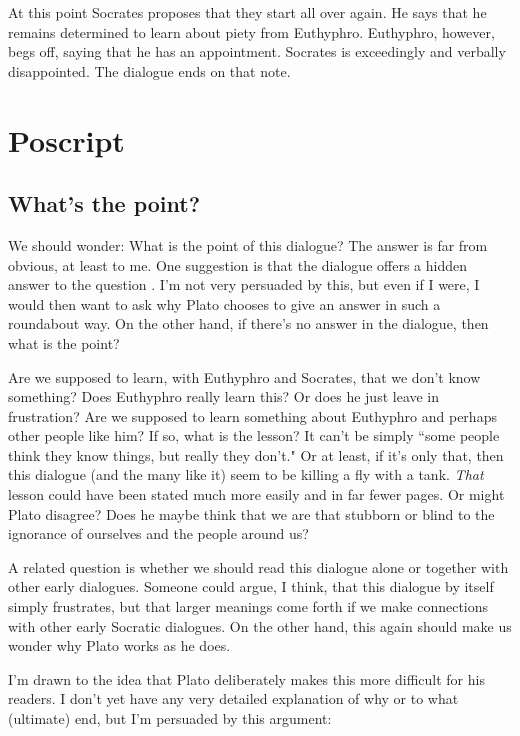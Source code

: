\documentclass[11pt]{article}
\begin{document}
At this point Socrates proposes that they start all over again.  He says that he remains determined to learn about piety from Euthyphro.  Euthyphro, however, begs off, saying that he has an appointment.  Socrates is exceedingly and verbally disappointed. The dialogue ends on that note.

\section{Poscript}

\subsection{What's the point?}

We should wonder: What is the point of this dialogue?  The answer is far from obvious, at least to me.  One suggestion is that the dialogue offers a hidden answer to the question .  I'm not very persuaded by this, but even if I were, I would then want to ask why Plato chooses to give an answer in such a roundabout way.  On the other hand, if there's no answer in the dialogue, then what is the point?

Are we supposed to learn, with Euthyphro and Socrates, that we don't know
something?  Does Euthyphro really learn this?  Or does he just leave in
frustration?  Are we supposed to learn something about Euthyphro and perhaps
other people like him?  If so, what is the lesson?  It can't be simply ``some
people think they know things, but really they don't."  Or at least, if it's
only that, then this dialogue (and the many like it) seem to be killing a fly
with a tank.  \emph{That} lesson could have been stated much more easily and in
far fewer pages.  Or might Plato disagree?  Does he maybe think that we are
that stubborn or blind to the ignorance of ourselves and the people around us?

A related question is whether we should read this dialogue alone or together with other early dialogues.  Someone could argue, I think, that this dialogue by itself simply frustrates, but that larger meanings come forth if we make connections with other early Socratic dialogues.  On the other hand, this again should make us wonder why Plato works as he does.

I'm drawn to the idea that Plato deliberately makes this more difficult for his readers.  I don't yet have any very detailed explanation of why or to what (ultimate) end, but I'm persuaded by this argument:
\end{document}
